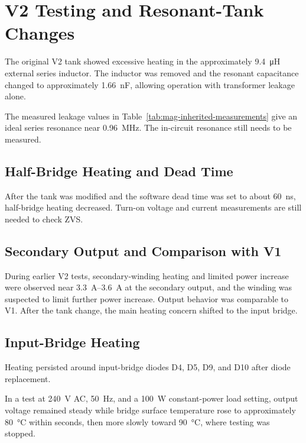 \section{V2 Testing and Resonant-Tank Changes}
\label{sec:res-v2-testing}

The original V2 tank showed excessive heating in the approximately
\SI{9.4}{\micro\henry} external series inductor. The inductor was removed
and the resonant capacitance changed to approximately
\SI{1.66}{\nano\farad}, allowing operation with transformer leakage alone.

The measured leakage values in Table~\ref{tab:mag-inherited-measurements}
give an ideal series resonance near \SI{0.96}{\mega\hertz}. The in-circuit
resonance still needs to be measured.

\subsection{Half-Bridge Heating and Dead Time}

After the tank was modified and the software dead time was set to about
\SI{60}{\nano\second}, half-bridge heating decreased. Turn-on voltage
and current measurements are still needed to check ZVS.

\subsection{Secondary Output and Comparison with V1}

During earlier V2 tests, secondary-winding heating and limited power increase were observed near
\SIrange{3.3}{3.6}{\ampere} at the secondary output, and the winding was
suspected to limit further power increase. Output behavior was comparable
to V1. After the tank change, the main heating concern shifted to the
input bridge.

\subsection{Input-Bridge Heating}

Heating persisted around input-bridge diodes D4, D5, D9, and D10 after
diode replacement.

In a test at \SI{240}{\volt} AC, \SI{50}{\hertz}, and a
\SI{100}{\watt} constant-power load setting, output voltage remained steady while bridge
surface temperature rose to approximately \SI{80}{\celsius} within seconds,
then more slowly toward \SI{90}{\celsius}, where testing was stopped.

